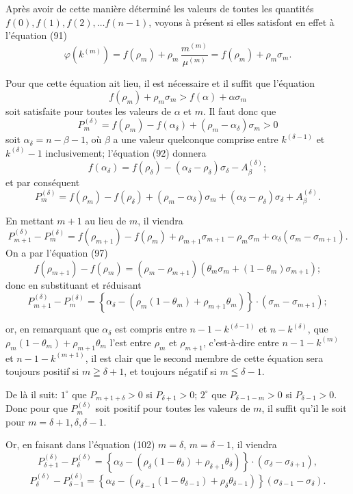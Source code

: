 \documentclass{article}
\begin{document}
Après avoir de cette manière déterminé les valeurs de toutes les quantités $f(0), f(1), f(2), \ldots f(n-1)$, voyons à présent si elles satisfont en effet à l'équation (91)
\[ \varphi(k^{(m)}) = f(\rho_m) + \rho_m\,\frac{m^{(m)}}{\mu^{(m)}} = f(\rho_m) + \rho_m \sigma_m. \]

Pour que cette équation ait lieu, il est nécessaire et il suffit que l'équation
\[ f(\rho_m) + \rho_m\sigma_m > f(\alpha) + \alpha\sigma_m \tag{99} \]
soit satisfaite pour toutes les valeurs de $\alpha$ et $m$. Il faut donc que
\[ P_m^{(\delta)} = f(\rho_m) - f(\alpha_\delta) + (\rho_m-\alpha_\delta)\sigma_m > 0 \tag{100} \]
soit $\alpha_\delta = n-\beta-1$, où $\beta$ a une valeur quelconque comprise entre $k^{(\delta-1)}$ et $k^{(\delta)}-1$ inclusivement; l'équation (92) donnera
\[ f(\alpha_\delta) = f(\rho_\delta) - (\alpha_\delta-\rho_\delta)\sigma_\delta - A_\beta^{(\delta)}; \]
et par conséquent
\[ P_m^{(\delta)} = f(\rho_m)-f(\rho_\delta)+(\rho_m-\alpha_\delta)\sigma_m+(\alpha_\delta-\rho_\delta)\sigma_\delta+A_\beta^{(\delta)}. \tag{101} \]

En mettant $m+1$ au lieu de $m$, il viendra
\[ P_{m+1}^{(\delta)} - P_m^{(\delta)} = f(\rho_{m+1})-f(\rho_m)+\rho_{m+1}\sigma_{m+1}-\rho_m\sigma_m+\alpha_\delta(\sigma_m-\sigma_{m+1}). \]
On a par l'équation (97)
\[ f(\rho_{m+1}) - f(\rho_m) = (\rho_m-\rho_{m+1})\left(\theta_m\sigma_m+(1-\theta_m)\sigma_{m+1}\right); \]
donc en substituant et réduisant
\[ P_{m+1}^{(\delta)} - P_m^{(\delta)} = \left\{\alpha_\delta - \left(\rho_m(1-\theta_m)+\rho_{m+1}\theta_m\right)\right\} \cdot (\sigma_m-\sigma_{m+1}); \tag{102} \]

or, en remarquant que $\alpha_\delta$ est compris entre $n-1-k^{(\delta-1)}$ et $n-k^{(\delta)}$, que $\rho_m(1-\theta_m)+\rho_{m+1}\theta_m$ l'est entre $\rho_m$ et $\rho_{m+1}$, c'est-à-dire entre $n-1-k^{(m)}$ et $n-1-k^{(m+1)}$, il est clair que le second membre de cette équation sera toujours positif si $m \geqq \delta+1$, et toujours négatif si $m \leqq \delta-1$.

De là il suit: $1^\circ$ que $P_{m+1+\delta} > 0$ si $P_{\delta+1} > 0$; $2^\circ$ que $P_{\delta-1-m} > 0$ si $P_{\delta-1} > 0$. Donc pour que $P_m^{(\delta)}$ soit positif pour toutes les valeurs de $m$, il suffit qu'il le soit pour $m = \delta+1, \delta, \delta-1$.

Or, en faisant dans l'équation (102) $m = \delta$, $m = \delta-1$, il viendra
\[ P_{\delta+1}^{(\delta)} - P_\delta^{(\delta)} = \left\{\alpha_\delta - \left(\rho_\delta(1-\theta_\delta)+\rho_{\delta+1}\theta_\delta\right)\right\} \cdot (\sigma_\delta-\sigma_{\delta+1}), \]
\[ P_\delta^{(\delta)} - P_{\delta-1}^{(\delta)} = \left\{\alpha_\delta - \left(\rho_{\delta-1}(1-\theta_{\delta-1})+\rho_\delta\theta_{\delta-1}\right)\right\}(\sigma_{\delta-1}-\sigma_\delta). \]
\end{document}

